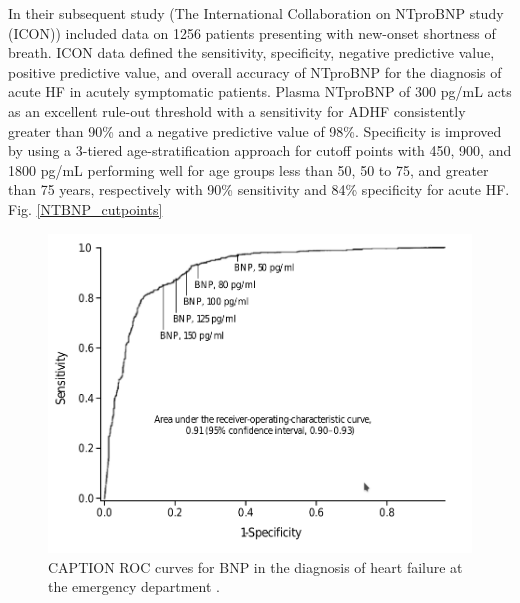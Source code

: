 \documentclass[14pt,a4paper,onecolumn]{extarticle}
\begin{document}
In their subsequent study (The International Collaboration on NTproBNP study (ICON)) \citep{Januzzi2006a} included data on 1256 patients presenting with new-onset shortness of breath. ICON data defined the sensitivity, specificity, negative predictive value, positive predictive value, and overall accuracy of NTproBNP for the diagnosis of acute HF in acutely symptomatic patients.  Plasma NTproBNP of 300 pg/mL acts as an excellent rule-out threshold with a sensitivity for ADHF consistently greater than 90\% and a negative predictive value of 98\%. Specificity is improved by using a 3-tiered age-stratification approach for cutoff points with 450, 900, and 1800 pg/mL performing well for age groups less than 50, 50 to 75, and greater than 75 years, respectively with 90\% sensitivity and 84\% specificity for acute HF. Fig. \ref{NTBNP_cutpoints}

\begin{figure}      \centering      \includegraphics[scale=0.4]{../../images/BNP_ER.png}      \small\caption{CAPTION ROC curves for BNP in the diagnosis of heart failure at the emergency department \citep{Januzzi2005}.}      \label{BNP_ER}  \end{figure}
\end{document}
